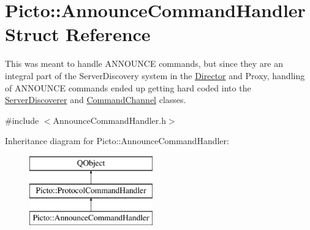 \hypertarget{struct_picto_1_1_announce_command_handler}{\section{Picto\-:\-:Announce\-Command\-Handler Struct Reference}
\label{struct_picto_1_1_announce_command_handler}
}


This was meant to handle A\-N\-N\-O\-U\-N\-C\-E commands, but since they are an integral part of the Server\-Discovery system in the \hyperlink{class_director}{Director} and Proxy, handling of A\-N\-N\-O\-U\-N\-C\-E commands ended up getting hard coded into the \hyperlink{struct_picto_1_1_server_discoverer}{Server\-Discoverer} and \hyperlink{class_picto_1_1_command_channel}{Command\-Channel} classes.  




{\ttfamily \#include $<$Announce\-Command\-Handler.\-h$>$}

Inheritance diagram for Picto\-:\-:Announce\-Command\-Handler\-:\begin{figure}[H]
\begin{center}
\leavevmode
\includegraphics[height=3.000000cm]{struct_picto_1_1_announce_command_handler}
\end{center}
\end{figure}
